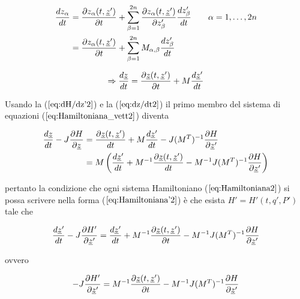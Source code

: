 \begin{equation*}
  \begin{split}
    \frac{d z_{\alpha}}{d t} &= \frac{\partial z_{\alpha}(t, \uline{z}')}{\partial t} + \sum_{\beta = 1}^{2n} \frac{\partial z_{\alpha}(t, \uline{z}')}{\partial z'_{\beta}} \frac{d z'_{\beta}}{d t} \qquad \alpha = 1, \dots, 2n \\
    &= \frac{\partial z_{\alpha}(t, \uline{z}')}{\partial t} + \sum_{\beta = 1}^{2n} M_{\alpha, \beta} \frac{d z'_{\beta}}{d t}
  \end{split}
\end{equation*}

\begin{equation} \label{eq:dz/dt2}
  \Rightarrow \frac{d \uline{z}}{d t} = \frac{\partial \uline{z}(t, \uline{z}')}{\partial t} + M \frac{d \uline{z}'}{d t}
\end{equation}

Usando la ($ \ref{eq:dH/dz'2} $) e la ($ \ref{eq:dz/dt2} $) il primo membro del sistema di equazioni ($ \ref{eq:Hamiltoniana_vett2} $) diventa

\begin{equation} \label{eq:dz/dt-JdH/dz2}
  \begin{split}
    \frac{d \uline{z}}{d t} - J \frac{\partial H}{\partial \uline{z}} &= \frac{\partial \uline{z}(t, \uline{z}')}{d t} + M \frac{d \uline{z}'}{d t} - J (M^T)^{-1} \frac{\partial H}{\partial \uline{z}'} \\
    &= M \left( \frac{d \uline{z}'}{d t} + M^{-1} \frac{\partial \uline{z}(t, \uline{z}')}{d t} - M^{-1}J(M^T)^{-1} \frac{\partial H}{\partial \uline{z}'} \right)
  \end{split}
\end{equation}

pertanto la condizione che ogni sistema Hamiltoniano ($ \ref{eq:Hamiltoniana2} $) si possa scrivere nella forma ($ \ref{eq:Hamiltoniana'2} $) è che esista $ H' = H'(t, q', P') $ tale che

\begin{equation} \label{eq:dz'/dtJ2}
  \frac{d \uline{z}'}{d t} - J \frac{\partial H'}{\partial \uline{z}'} = \frac{d \uline{z}'}{d t} + M^{-1} \frac{\partial \uline{z}(t, \uline{z}')}{\partial t} - M^{-1} J (M^T)^{-1} \frac{\partial H}{\partial \uline{z}'}
\end{equation}

ovvero

\begin{equation} \label{eq:-JdH'/dz'2}
  - J \frac{\partial H'}{\partial \uline{z}'} = M^{-1} \frac{\partial \uline{z}(t, \uline{z}')}{\partial t} - M^{-1} J (M^T)^{-1} \frac{\partial H}{\partial \uline{z}'}
\end{equation}


